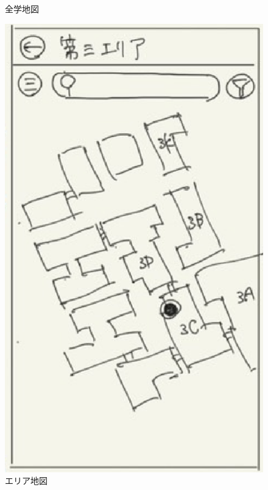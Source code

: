 \documentclass[12pt,a4paper,dvipdf]{jsarticle}
\begin{document}
\begin{figure}[H]
\begin{minipage}[b]{0.24\columnwidth}
        \caption{全学地図}
        \label{fig:全学地図}
    \end{minipage}
    \begin{minipage}[b]{0.24\columnwidth}
        \centering
        \includegraphics[width=0.9\columnwidth]{./img/エリア地図.png}
        \caption{エリア地図}
        \label{fig:エリア地図}
    \end{minipage}
    \begin{minipage}[b]{0.24\columnwidth}
        \centering

\end{minipage}
\end{figure}
\end{document}
